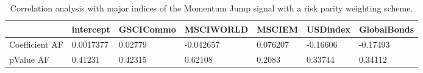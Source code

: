 \begin{table}[H]
\centering
\begin{tabular}{lllllll}
\hline& intercept & GSCICommo & MSCIWORLD & MSCIEM & USDindex & GlobalBonds \\ 
\hline 
Coefficient AF & 0.0017377 & 0.02779 & -0.042657 & 0.076207 & -0.16606 & -0.17493 \\ 
pValue AF & 0.41231 & 0.42315 & 0.62108 & 0.2083 & 0.33744 & 0.34112 \\ 
\hline
\end{tabular}
\caption{Correlation analysis with major indices of the Momentum Jump signal with a risk parity weighting scheme.}
\label{MOMJUMPRP_AFACTOR}
\end{table}